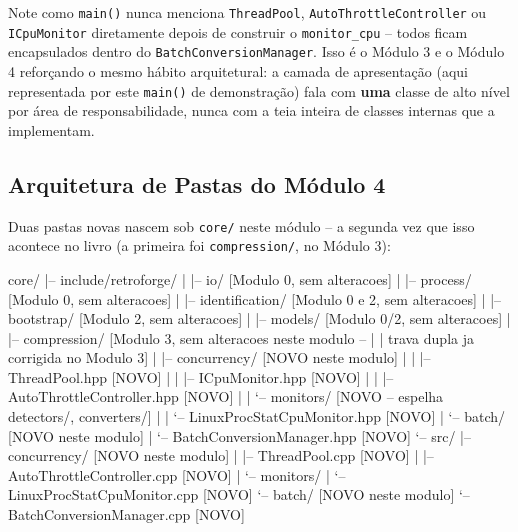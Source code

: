 \begin{CaixaInfo}
Note como \texttt{main()} nunca menciona \texttt{ThreadPool}, \texttt{AutoThrottleController} ou \texttt{ICpuMonitor} diretamente depois de construir o \texttt{monitor\_cpu} -- todos ficam encapsulados dentro do \texttt{BatchConversionManager}. Isso é o Módulo 3 e o Módulo 4 reforçando o mesmo hábito arquitetural: a camada de apresentação (aqui representada por este \texttt{main()} de demonstração) fala com \textbf{uma} classe de alto nível por área de responsabilidade, nunca com a teia inteira de classes internas que a implementam.
\end{CaixaInfo}

\subsection{Arquitetura de Pastas do Módulo 4}

Duas pastas novas nascem sob \texttt{core/} neste módulo -- a segunda vez que isso acontece no livro (a primeira foi \texttt{compression/}, no Módulo 3):

\begin{CaixaArvore}
core/
|-- include/retroforge/
|   |-- io/                              [Modulo 0, sem alteracoes]
|   |-- process/                         [Modulo 0, sem alteracoes]
|   |-- identification/                  [Modulo 0 e 2, sem alteracoes]
|   |-- bootstrap/                       [Modulo 2, sem alteracoes]
|   |-- models/                          [Modulo 0/2, sem alteracoes]
|   |-- compression/                     [Modulo 3, sem alteracoes neste modulo --
|   |                                      trava dupla ja corrigida no Modulo 3]
|   |-- concurrency/                     [NOVO neste modulo]
|   |   |-- ThreadPool.hpp               [NOVO]
|   |   |-- ICpuMonitor.hpp              [NOVO]
|   |   |-- AutoThrottleController.hpp   [NOVO]
|   |   `-- monitors/                    [NOVO -- espelha detectors/, converters/]
|   |       `-- LinuxProcStatCpuMonitor.hpp [NOVO]
|   `-- batch/                           [NOVO neste modulo]
|       `-- BatchConversionManager.hpp   [NOVO]
`-- src/
    |-- concurrency/                     [NOVO neste modulo]
    |   |-- ThreadPool.cpp               [NOVO]
    |   |-- AutoThrottleController.cpp   [NOVO]
    |   `-- monitors/
    |       `-- LinuxProcStatCpuMonitor.cpp [NOVO]
    `-- batch/                           [NOVO neste modulo]
        `-- BatchConversionManager.cpp   [NOVO]
\end{CaixaArvore}

